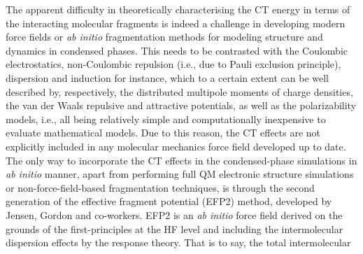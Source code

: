 \documentclass[aip,jcp,amsmath,amssymb,reprint,floatfix]{revtex4-1}
\begin{document}
The apparent difficulty in theoretically characterising the CT energy
in terms of the interacting molecular fragments
is indeed a challenge in developing modern force fields 
or \emph{ab initio} fragmentation methods\cite{Gordon.Fedorov.Pruitt.Slipchenko.ChemRev.2012}
for modeling structure
and dynamics in condensed phases.\cite{Demerdash.Mao.Liu.Head-Gordon.Head-Gordon.JCP.2017}
This needs to be contrasted with the Coulombic electrostatics,
non\hyp{}Coulombic repulsion (i.e., due to Pauli exclusion principle), 
dispersion and induction for instance, 
which to a certain extent
can be well described by, respectively, 
the distributed multipole moments of charge densities,\cite{Sokalski.Poirier.CPL.1983,
Etchebest.Lavery.Pullman.TheorChimActa.1982,Stone.JCTC.2005}
the van der Waals repulsive and attractive potentials, 
as well as the polarizability models, i.e., all being relatively simple and computationally
inexpensive to evaluate mathematical models. 
Due to this reason, the CT effects 
are not explicitly included in any molecular mechanics force field 
developed up to date.\cite{Demerdash.Yap.Head-Gordon.AnnuRevPhysChem.2014}
The only way to
incorporate the CT effects in the condensed\hyp{}phase simulations
in \emph{ab initio} manner,
apart from performing full QM electronic structure simulations
or non\hyp{}force\hyp{}field\hyp{}based 
fragmentation techniques\cite{Leverentz.Maerzke.Keasler.Siepmann.Truhlar.PCCP.2012,
Dahlke.Truhlar.JCTC.2008},
is through the second generation of the effective fragment potential 
(EFP2) method,\cite{Gordon.Smith.Xu.Slipchenko.AnnuRevPhysChem.2013,
   Nguyen.Pachter.Day.JCP.2014,
   Day.Jensen.Gordon.Webb.Stevens.Krauss.Garmer.Basch.Cohen.JCP.1996,
   Sattasathuchana.Xu.Gordon.JPCA.2019,
   Blasiak.Londergan.Webb.Cho.ACR.2017,
   Kuroki.Mori.ChemLett.2016,
   Ghosh.Cho.Choi.JPCB.2014}
developed by Jensen, Gordon and co\hyp{}workers.\cite{Jensen.JCP.2001,Li.Gordon.Jensen.JCP.2006,Xu.Gordon.JCP.2013}
EFP2 is an \emph{ab initio} force field
derived on the grounds of the first\hyp{}principles %
at the HF level\cite{Jensen.Gordon.MolPhys.1996,Jensen.Gordon.JCP.1998,Li.Netzloff.Gordon.JCP.2006} 
and including the intermolecular dispersion effects
by the response theory.\cite{Adamovic.Gordon.MolPhys.2005,Xu.Zahariev.Gordon.JCTC.2014}
That is to say, the total intermolecular 
\end{document}
